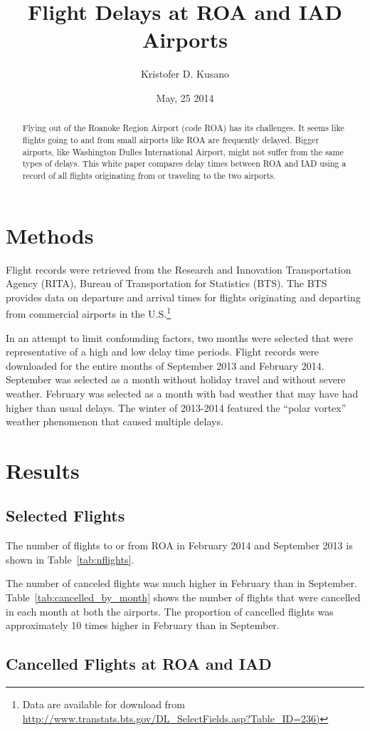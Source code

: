 \documentclass[dvips,letterpaper]{article}
\author{Kristofer D. Kusano}
\title{Flight Delays at ROA and IAD Airports}
\date{May, 25 2014}
\newcommand{\resultsdir}{../../results/2014-05-23/}
\begin{document}
\maketitle

\begin{abstract}
  Flying out of the Roanoke Region Airport (code ROA) has its challenges.
  It seems like flights going to and from small airports like ROA are frequently delayed.
  Bigger airports, like Washington Dulles International Airport, might not suffer from the same types of delays.
  This white paper compares delay times between ROA and IAD using a record of all flights originating from or traveling to the two airports.
\end{abstract}

\section{Methods}
\label{sec:Methods}
Flight records were retrieved from the Research and Innovation Transportation Agency (RITA), Bureau of Transportation for Statistics (BTS).
The BTS provides data on departure and arrival times for flights originating and departing from commercial airports in the U.S.\footnote{Data are available for download from
  \url{http://www.transtats.bts.gov/DL_SelectFields.asp?Table_ID=236)}}

In an attempt to limit confounding factors, two months were selected that were representative of a high and low delay time periods.
Flight records were downloaded for the entire months of September 2013 and February 2014.
September was selected as a month without holiday travel and without severe weather.
February was selected as a month with bad weather that may have had higher than usual delays.
The winter of 2013-2014 featured the ``polar vortex'' weather phenomenon that caused multiple delays.
\section{Results}
\label{sec:Results}

\subsection{Selected Flights}
\label{sub:select}
The number of flights to or from ROA in February 2014 and September 2013 is shown in Table~\ref{tab:nflights}.


The number of canceled flights was much higher in February than in September.
Table~\ref{tab:cancelled_by_month} shows the number of flights that were cancelled in each month at both the airports.
The proportion of cancelled flights was approximately 10 times higher in February than in September.


\subsection{Cancelled Flights at ROA and IAD}
\label{sub:canelled}
\end{document}
